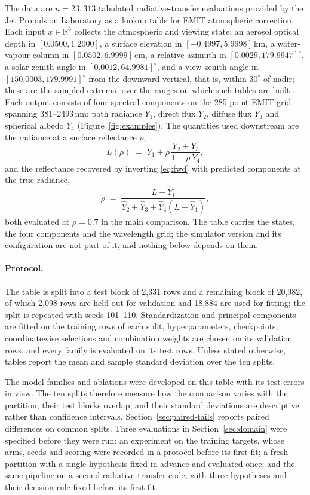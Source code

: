 \documentclass[11pt]{article}
\newcommand{\1}{\mathbf{1}}
\begin{document}
The data are $n = 23{,}313$ tabulated radiative-transfer evaluations provided by the Jet
Propulsion Laboratory as a lookup table for EMIT atmospheric correction. Each input
$x \in \mathbb{R}^6$ collects the atmospheric and viewing state: an aerosol optical depth in
$[0.0500, 1.2000]$, a surface elevation in $[-0.4997, 5.9998]$\,km, a water-vapour column in
$[0.0502, 6.9999]$\,cm, a relative azimuth in $[0.0029, 179.9947]^\circ$, a solar zenith angle
in $[0.0012, 64.9981]^\circ$, and a view zenith angle in $[150.0003, 179.9991]^\circ$ from the
downward vertical, that is, within $30^\circ$ of nadir; these are the sampled extrema, over the
ranges on which such tables are built \cite{isofit,modtran}. Each output consists of four
spectral components on the 285-point EMIT grid spanning 381--2493\,nm: path radiance $Y_1$,
direct flux $Y_2$, diffuse flux $Y_3$ and spherical albedo $Y_4$ (Figure~\ref{fig:examples}).
The quantities used downstream are the radiance at a surface reflectance $\rho$,
\begin{equation}\label{eq:fwd}
L(\rho) \;=\; Y_1 + \rho\,\frac{Y_2 + Y_3}{1 - \rho\, Y_4},
\end{equation}
and the reflectance recovered by inverting \eqref{eq:fwd} with predicted components at the true
radiance,
\begin{equation}\label{eq:inv}
\hat\rho \;=\; \frac{L - \hat Y_1}{\hat Y_2 + \hat Y_3 + \hat Y_4 (L - \hat Y_1)},
\end{equation}
both evaluated at $\rho = 0.7$ in the main comparison. The table carries the states, the four
components and the wavelength grid; the simulator version and its configuration are not part of
it, and nothing below depends on them.

\paragraph{Protocol.}
The table is split into a test block of 2{,}331 rows and a remaining block of 20{,}982, of
which 2{,}098 rows are held out for validation and 18{,}884 are used for fitting; the split is
repeated with seeds 101--110. Standardization and principal components are fitted on the
training rows of each split, hyperparameters, checkpoints, coordinatewise selections and
combination weights are chosen on its validation rows, and every family is evaluated on its
test rows. Unless stated otherwise, tables report the mean and sample standard deviation over
the ten splits.

The model families and ablations were developed on this table with its test errors in view.
The ten splits therefore measure how the comparison varies with the partition; their test
blocks overlap, and their standard deviations are descriptive rather than confidence
intervals. Section~\ref{sec:paired-tails} reports paired differences on common splits.
Three evaluations in Section~\ref{sec:domain} were specified before they were run: an experiment
on the training targets, whose arms, seeds and scoring were recorded in a protocol before its
first fit; a fresh partition with a single hypothesis fixed in advance and evaluated once; and
the same pipeline on a second radiative-transfer code, with three hypotheses and their decision
rule fixed before its first fit.
\end{document}

